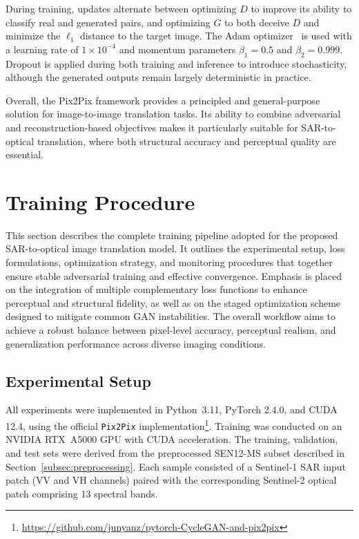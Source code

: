 During training, updates alternate between optimizing $D$ to improve its ability to classify real and generated pairs, and optimizing $G$ to both deceive $D$ and minimize the $\ell_1$ distance to the target image. The Adam optimizer~\cite{adam_optimizer_2017} is used with a learning rate of $1 \times 10^{-4}$ and momentum parameters $\beta_1 = 0.5$ and $\beta_2 = 0.999$. Dropout is applied during both training and inference to introduce stochasticity, although the generated outputs remain largely deterministic in practice.

Overall, the Pix2Pix framework provides a principled and general-purpose solution for image-to-image translation tasks. Its ability to combine adversarial and reconstruction-based objectives makes it particularly suitable for SAR-to-optical translation, where both structural accuracy and perceptual quality are essential.


\section{Training Procedure}
This section describes the complete training pipeline adopted for the proposed SAR-to-optical image translation model. It outlines the experimental setup, loss formulations, optimization strategy, and monitoring procedures that together ensure stable adversarial training and effective convergence. Emphasis is placed on the integration of multiple complementary loss functions to enhance perceptual and structural fidelity, as well as on the staged optimization scheme designed to mitigate common GAN instabilities. The overall workflow aims to achieve a robust balance between pixel-level accuracy, perceptual realism, and generalization performance across diverse imaging conditions.

\subsection{Experimental Setup} All experiments were implemented in Python~3.11, PyTorch 2.4.0, and CUDA 12.4, using the official \texttt{Pix2Pix} implementation\footnote{\url{https://github.com/junyanz/pytorch-CycleGAN-and-pix2pix}}. Training was conducted on an NVIDIA RTX~A5000 GPU with CUDA acceleration. The training, validation, and test sets were derived from the preprocessed SEN12-MS subset described in Section~\ref{subsec:preprocessing}. Each sample consisted of a Sentinel-1 SAR input patch (VV and VH channels) paired with the corresponding Sentinel-2 optical patch comprising 13 spectral bands.

